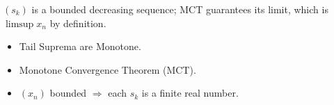 \begin{remark*}
$(s_k)$ is a bounded decreasing sequence; MCT guarantees its limit, which is $\limsup x_n$ by definition.
\end{remark*}

\begin{remark*}[Dependencies]
\begin{itemize}
  \item Tail Suprema are Monotone.
  \item Monotone Convergence Theorem (MCT).
  \item $(x_n)$ bounded $\Rightarrow$ each $s_k$ is a finite real number.
\end{itemize}
\end{remark*}
